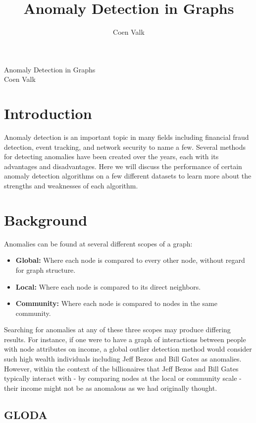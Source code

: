 \documentclass[10pt,letterpaper]{article}
\title{Anomaly Detection in Graphs}
\author{Coen Valk}
\begin{document}
\begin{huge}
\begin{center}
Anomaly Detection in Graphs\\
Coen Valk
\end{center}
\end{huge}
\section{Introduction}

Anomaly detection is an important topic in many fields including financial
fraud detection, event tracking, and network security to name a few.
Several methods for detecting anomalies have been created over the years, each
with its advantages and disadvantages. Here we will discuss the performance of
certain anomaly detection algorithms on a few different datasets to learn more
about the strengths and weaknesses of each algorithm.

\section{Background}

Anomalies can be found at several different scopes of a graph:

\begin{itemize}
	\item \textbf{Global:} Where each node is compared to every other node,
		without regard for graph structure.
	\item \textbf{Local:} Where each node is compared to its direct neighbors.
	\item \textbf{Community:} Where each node is compared to nodes in the same
		community.
\end{itemize}

Searching for anomalies at any of these three scopes may produce differing
results. For instance, if one were to have a graph of interactions between people
with node attributes on income, a global outlier detection method would consider
such high wealth individuals including Jeff Bezos and Bill Gates as anomalies.
However, within the context of the billionaires that Jeff Bezos and Bill Gates
typically interact with - by comparing nodes at the local or community scale -
their income might not be as anomalous as we had originally thought.

\subsection{GLODA}
\end{document}
